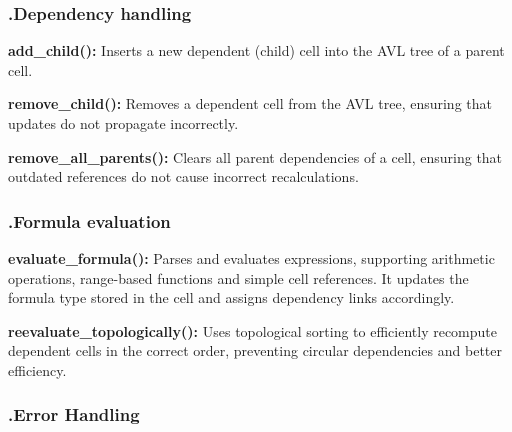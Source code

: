 \documentclass{styles}
\begin{document}
\subsubsection*{\fontsize{14}{11} \selectfont .Dependency handling}

\noindent
{\fontsize{14pt}{11pt} \selectfont \textbf{add\_child():}}  
{\fontsize{14pt}{11pt} \selectfont  Inserts a new dependent (child) cell into the AVL tree of a parent cell.}

\vspace{3pt} %

\noindent
{\fontsize{14pt}{11pt} \selectfont \textbf{remove\_child():}}  
{\fontsize{14pt}{11pt} \selectfont Removes a dependent cell from the AVL tree, ensuring that updates do not propagate incorrectly.}

\vspace{3pt} %

\noindent
{\fontsize{14pt}{11pt} \selectfont \textbf{remove\_all\_parents():}}  
{\fontsize{14pt}{11pt} \selectfont Clears all parent dependencies of a cell, ensuring that outdated references do not cause incorrect recalculations.}

\subsubsection*{\fontsize{14}{11} \selectfont .Formula evaluation}

\noindent
{\fontsize{14pt}{11pt} \selectfont \textbf{evaluate\_formula():}}  
{\fontsize{14pt}{11pt} \selectfont  Parses and evaluates expressions, supporting arithmetic operations, range-based functions and simple cell references. It updates the formula type stored in the cell and assigns dependency links accordingly.}

\vspace{3pt} %

\noindent
{\fontsize{14pt}{11pt} \selectfont \textbf{reevaluate\_topologically():}}  
{\fontsize{14pt}{11pt} \selectfont Uses topological sorting to efficiently recompute dependent cells in the correct order, preventing circular dependencies and better efficiency.}

\subsubsection*{\fontsize{14}{11} \selectfont .Error Handling}
\end{document}
